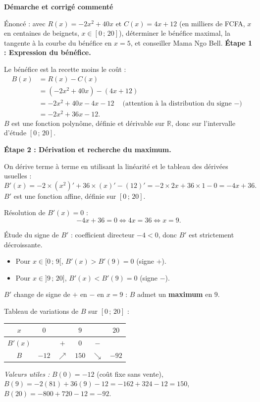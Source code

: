 \documentclass[11pt]{article}
\begin{document}
\textbf{Démarche et corrigé commenté}\par
\begin{exoresolu}
Énoncé : avec $R(x) = -2x^2 + 40x$ et $C(x) = 4x + 12$ (en milliers de FCFA, $x$ en centaines de beignets, $x \in [0\,;\,20]$), déterminer le bénéfice maximal, la tangente à la courbe du bénéfice en $x=5$, et conseiller Mama Ngo Bell.
\tcblower
\textbf{Étape 1 : Expression du bénéfice.}

Le bénéfice est la recette moins le coût :
\begin{align*}
B(x) &= R(x) - C(x) \\
&= (-2x^2 + 40x) - (4x + 12) \\
&= -2x^2 + 40x - 4x - 12 \quad \text{(attention à la distribution du signe $-$) } \\
&= -2x^2 + 36x - 12.
\end{align*}
$B$ est une fonction polynôme, définie et dérivable sur $\mathbb{R}$, donc sur l'intervalle d'étude $[0\,;\,20]$.

\textbf{Étape 2 : Dérivation et recherche du maximum.}

On dérive terme à terme en utilisant la linéarité et le tableau des dérivées usuelles :
\[ B'(x) = -2 \times (x^2)' + 36 \times (x)' - (12)' = -2 \times 2x + 36 \times 1 - 0 = -4x + 36. \]
$B'$ est une fonction affine, définie sur $[0\,;\,20]$.

Résolution de $B'(x) = 0$ :
\[ -4x + 36 = 0 \iff 4x = 36 \iff x = 9. \]

Étude du signe de $B'$ : coefficient directeur $-4 < 0$, donc $B'$ est strictement décroissante.
\begin{itemize}
\item Pour $x \in [0\,;\,9[$, $B'(x) > B'(9) = 0$ (signe $+$).
\item Pour $x \in ]9\,;\,20]$, $B'(x) < B'(9) = 0$ (signe $-$).
\end{itemize}
$B'$ change de signe de $+$ en $-$ en $x=9$ : $B$ admet un \textbf{maximum} en $9$.

Tableau de variations de $B$ sur $[0\,;\,20]$ :
\begin{center}
\begin{tabular}{|c|ccccc|}\hline
$x$ & $0$ & & $9$ & & $20$ \\ \hline
$B'(x)$ & & $+$ & $0$ & $-$ & \\ \hline
$B$ & $-12$ & $\nearrow$ & $150$ & $\searrow$ & $-92$ \\ \hline
\end{tabular}
\end{center}
\emph{Valeurs utiles :} $B(0) = -12$ (coût fixe sans vente), $B(9) = -2(81) + 36(9) - 12 = -162 + 324 - 12 = 150$, $B(20) = -800 + 720 - 12 = -92$.


\end{exoresolu}
\end{document}
